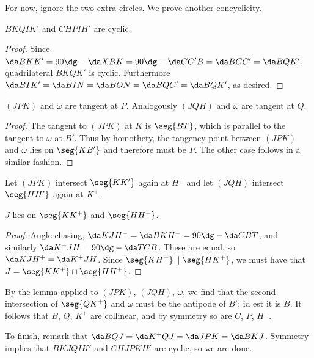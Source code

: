For now, ignore the two extra circles. We prove another concyclicity.
\begin{claim}
    $BKQIK'$ and $CHPIH'$ are cyclic.
\end{claim}
\begin{proof}
    Since $\da BKK'=90\dg-\da XBK=90\dg-\da CC'B=\da BCC'=\da BQK'$, quadrilateral $BKQK'$ is cyclic. Furthermore $\da BIK'=\da BIN=\da BON=\da BQC'=\da BQK'$, as desired.
\end{proof}
\begin{claim}
    $(JPK)$ and $\omega$ are tangent at $P$. Analogously $(JQH)$ and $\omega$ are tangent at $Q$.
\end{claim}
\begin{proof}
    The tangent to $(JPK)$ at $K$ is $\seg{BT}$, which is parallel to the tangent to $\omega$ at $B'$. Thus by homothety, the tangency point between $(JPK)$ and $\omega$ lies on $\seg{KB'}$ and therefore must be $P$. The other case follows in a similar fashion.
\end{proof}

Let $(JPK)$ intersect $\seg{KK'}$ again at $H^+$ and let $(JQH)$ intersect $\seg{HH'}$ again at $K^+$.
\begin{claim}
    $J$ lies on $\seg{KK^+}$ and $\seg{HH^+}$.
\end{claim}
\begin{proof}
    Angle chasing, $\da KJH^+=\da BKH^+=90\dg-\da CBT$, and similarly $\da K^+JH=90\dg-\da TCB$. These are equal, so $\da KJH^+=\da K^+JH$. Since $\seg{KH^+}\parallel\seg{HK^+}$, we must have that $J=\seg{KK^+}\cap\seg{HH^+}$.
\end{proof}

By the lemma applied to $(JPK)$, $(JQH)$, $\omega$, we find that the second intersection of $\seg{QK^+}$ and $\omega$ must be the antipode of $B'$; id est it is $B$. It follows that $B$, $Q$, $K^+$ are collinear, and by symmetry so are $C$, $P$, $H^+$.

To finish, remark that $\da BQJ=\da K^+QJ=\da JPK=\da BKJ$. Symmetry implies that $BKJQIK'$ and $CHJPKH'$ are cyclic, so we are done.

